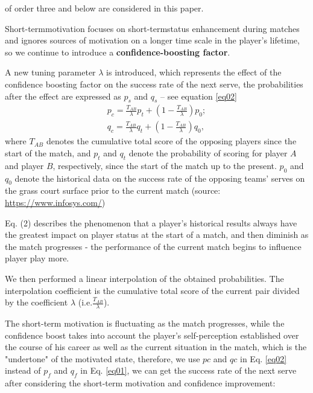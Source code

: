 \documentclass{mcmthesis}
\begin{document}
of order three and below are considered in this paper.\par
Short-termmotivation focuses on short-termstatus enhancement during matches and ignores
sources of motivation on a longer time scale in the player’s lifetime, so we continue to introduce
a \textbf{confidence-boosting factor}.\par
A new tuning parameter $\lambda$ is introduced, which represents the effect of the confidence
boosting factor on the success rate of the next serve, the probabilities after the effect are
expressed as $p_s$ and $q_s$ – see equation \eqref{eq02}
\begin{equation}
  \begin{split}
    p_c = \frac{T_{AB}}{\lambda} p_t + \left(1 - \frac{T_{AB}}{\lambda}\right) p_0;\\
  q_c = \frac{T_{AB}}{\lambda} q_t + \left(1 - \frac{T_{AB}}{\lambda}\right) q_0,
  \end{split}
  \label{eq02}
\end{equation}
where $T_{AB}$ denotes the cumulative total score of the opposing players since the start of the
match, and $p_t$ and $q_t$ denote the probability of scoring for player $A$ and player $B$, respectively,
since the start of the match up to the present. $p_0$ and $q_0$ denote the historical data on the success
rate of the opposing teams’ serves on the grass court surface prior to the current match (source:
\url{https://www.infosys.com/})\par
Eq. (2) describes the phenomenon that a player’s historical results always have the greatest
impact on player status at the start of a match, and then diminish as the match progresses - the
performance of the current match begins to influence player play more.\par
We then performed a linear interpolation of the obtained probabilities. The interpolation
coefficient is the cumulative total score of the current pair divided by the coefficient $\lambda$ (i.e.$\frac{T_{AB}}{\lambda}$).\par
The short-term motivation is fluctuating as the match progresses, while the confidence boost
takes into account the player’s self-perception established over the course of his career as well
as the current situation in the match, which is the "undertone" of the motivated state, therefore,
we use $pc$ and $qc$ in Eq. \eqref{eq02} instead of $p_f$ and $q_f$ in Eq. \eqref{eq01}, we can get the success rate of the
next serve after considering the short-term motivation and confidence improvement:
\end{document}
